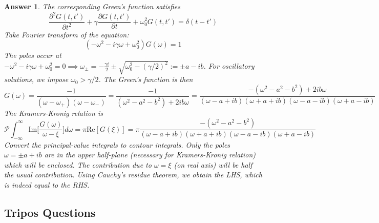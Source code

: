 \documentclass[a4paper]{article}
\newtheorem{ans}{Answer}[section]
\theoremstyle{new}
\begin{document}
\begin{ans}
The corresponding Green's function satisfies
$$\frac{\partial^2G(t,t')}{\partial t^2}+\gamma\frac{\partial G(t,t')}{\partial t}+\omega_0^2G(t,t')=\delta(t-t')$$
Take Fourier transform of the equation:
$$(-\omega^2-i\gamma\omega+\omega_0^2)G(\omega)=1$$
The poles occur at $-\omega^2-i\gamma\omega+\omega_0^2=0\implies\omega_\pm=-\frac{\gamma i}{2}\pm\sqrt{\omega_0^2-(\gamma/2)^2}:=\pm a-ib$. For oscillatory solutions, we impose $\omega_0>\gamma/2$. The Green's function is then
$$G(\omega)=\frac{-1}{(\omega-\omega_+)(\omega-\omega_-)}=\frac{-1}{(\omega^2-a^2-b^2)+2ib\omega}=\frac{-(\omega^2-a^2-b^2)+2ib\omega}{(\omega-a+ib)(\omega+a+ib)(\omega-a-ib)(\omega+a-ib)}$$
The Kramers-Kronig relation is
$$\mathcal{P}\int_{-\infty}^\infty\text{Im}\bigg[\frac{G(\omega)}{\omega-\xi}\bigg]d\omega=\pi\text{Re}[G(\xi)]=\pi\frac{-(\omega^2-a^2-b^2)}{(\omega-a+ib)(\omega+a+ib)(\omega-a-ib)(\omega+a-ib)}$$
Convert the principal-value integrals to contour integrals. Only the poles $\omega=\pm a+ib$ are in the upper half-plane (necessary for Kramers-Kronig relation) which will be enclosed. The contribution due to $\omega=\xi$ (on real axis) will be half the usual contribution. Using Cauchy's residue theorem, we obtain the LHS, which is indeed equal to the RHS.
\end{ans}
\newpage
\subsection{Tripos Questions}
\end{document}
